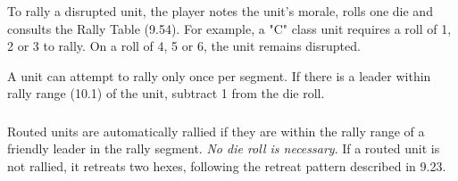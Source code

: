 \subsubsection[How to Rally]{} To rally a disrupted unit, the player notes the unit's morale, rolls one die and consults the Rally Table (9.54). For example, a "C" class unit requires a roll of 1, 2 or 3 to rally. On a roll of 4, 5 or 6, the unit remains disrupted.

A unit can attempt to rally only once per segment. If there is a leader within rally range (10.1) of the unit, subtract 1 from the die roll.

\subsubsection[Routed Units]{} Routed units are automatically rallied if they are within the rally range of a friendly leader in the rally segment. \textit{No die roll is necessary}. If a routed unit is not rallied, it retreats two hexes, following the retreat pattern described in 9.23.